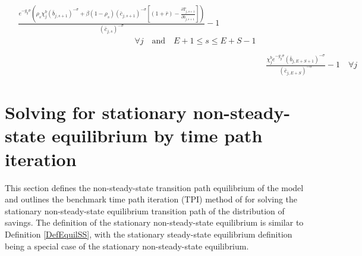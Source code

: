 \documentclass[letterpaper,12pt]{article}
\theoremstyle{definition}
\begin{document}
\begin{enumerate}
\begin{align}
        \begin{split}
          &\frac{e^{-g_y\sigma}\left(\rho_s\chi^b_j \left(\bar{b}_{j,s+1}\right)^{-\sigma} + \beta(1-\rho_s)(\bar{c}_{j,s+1})^{-\sigma}\left[(1 + \bar{r}) - \frac{\partial \bar{T}_{j,s+1}}{\partial \bar{b}_{j,s+1}}\right]\right)}{(\bar{c}_{j,s})^{-\sigma}} - 1 \\
          &\qquad\qquad\qquad\qquad\qquad\qquad\qquad\forall j \quad\text{and}\quad E+1\leq s\leq E+S-1 \\
        \end{split} \label{EqSSeulerrSav} \\
        &\frac{\chi^b_j e^{-g_y\sigma}(\bar{b}_{j,E+S+1})^{-\sigma}}{\left(\bar{c}_{j,E+S}\right)^{-\sigma}} - 1 \quad\forall j \label{EqSSeulerrBeq}
      \end{align}
  \end{enumerate}


\newpage
\section{Solving for stationary non-steady-state equilibrium by time path iteration}\label{AppNonSSsolve}

  \setcounter{equation}{0}

  This section defines the non-steady-state transition path equilibrium of the model and outlines the benchmark time path iteration (TPI) method of \citet{AuerbachKotlikoff:1987} for solving the stationary non-steady-state equilibrium transition path of the distribution of savings. The definition of the stationary non-steady-state equilibrium is similar to Definition \ref{DefEquilSS}, with the stationary steady-state equilibrium definition being a special case of the stationary non-steady-state equilibrium.

  \vspace{7mm}
\end{document}
